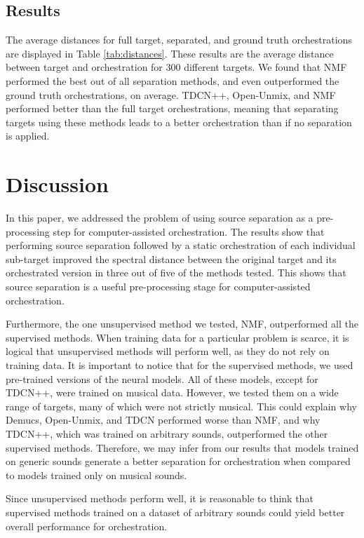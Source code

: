 \documentclass{article}
\begin{document}
		\subsection{Results}
		The average distances for full target, separated, and ground truth orchestrations are displayed in Table \ref{tab:distances}. These results are the average distance between target and orchestration for 300 different targets. We found that NMF performed the best out of all separation methods, and even outperformed the ground truth orchestrations, on average. TDCN++, Open-Unmix, and NMF performed better than the full target orchestrations, meaning that separating targets using these methods leads to a better orchestration than if no separation is applied.
	
	\section{Discussion}\label{sec:discussion}
	In this paper, we addressed the problem of using source separation as a pre-processing step for computer-assisted orchestration. The results show that performing source separation followed by a static orchestration of each individual sub-target improved the spectral distance between the original target and its orchestrated version in three out of five of the methods tested. This shows that source separation is a useful pre-processing stage for computer-assisted orchestration. 
	
	Furthermore, the one unsupervised method we tested, NMF, outperformed all the supervised methods. When training data for a particular problem is scarce, it is logical that unsupervised methods will perform well, as they do not rely on training data. It is important to notice that for the supervised methods, we used pre-trained versions of the neural models. All of these models, except for TDCN++, were trained on musical data. However, we tested them on a wide range of targets, many of which were not strictly musical. This could explain why Demucs, Open-Unmix, and TDCN performed worse than NMF, and why TDCN++, which was trained on arbitrary sounds, outperformed the other supervised methods. Therefore, we may infer from our results that models trained on generic sounds generate a better separation for orchestration when compared to models trained only on musical sounds.
	
	Since unsupervised methods perform well, it is reasonable to think that supervised methods trained on a dataset of arbitrary sounds could yield better overall performance for orchestration.
	
\end{document}
